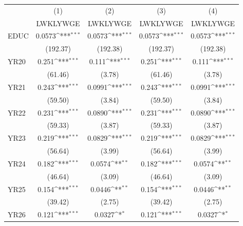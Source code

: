 {
\def\sym#1{\ifmmode^{#1}\else\(^{#1}\)\fi}
\begin{tabular}{l*{4}{c}}
\hline\hline
            &\multicolumn{1}{c}{(1)}&\multicolumn{1}{c}{(2)}&\multicolumn{1}{c}{(3)}&\multicolumn{1}{c}{(4)}\\
            &\multicolumn{1}{c}{LWKLYWGE}&\multicolumn{1}{c}{LWKLYWGE}&\multicolumn{1}{c}{LWKLYWGE}&\multicolumn{1}{c}{LWKLYWGE}\\
\hline
EDUC        &      0.0573\sym{***}&      0.0573\sym{***}&      0.0573\sym{***}&      0.0573\sym{***}\\
            &    (192.37)         &    (192.38)         &    (192.37)         &    (192.38)         \\
[1em]
YR20        &       0.251\sym{***}&       0.111\sym{***}&       0.251\sym{***}&       0.111\sym{***}\\
            &     (61.46)         &      (3.78)         &     (61.46)         &      (3.78)         \\
[1em]
YR21        &       0.243\sym{***}&      0.0991\sym{***}&       0.243\sym{***}&      0.0991\sym{***}\\
            &     (59.50)         &      (3.84)         &     (59.50)         &      (3.84)         \\
[1em]
YR22        &       0.231\sym{***}&      0.0890\sym{***}&       0.231\sym{***}&      0.0890\sym{***}\\
            &     (59.33)         &      (3.87)         &     (59.33)         &      (3.87)         \\
[1em]
YR23        &       0.219\sym{***}&      0.0829\sym{***}&       0.219\sym{***}&      0.0829\sym{***}\\
            &     (56.64)         &      (3.99)         &     (56.64)         &      (3.99)         \\
[1em]
YR24        &       0.182\sym{***}&      0.0574\sym{**} &       0.182\sym{***}&      0.0574\sym{**} \\
            &     (46.64)         &      (3.09)         &     (46.64)         &      (3.09)         \\
[1em]
YR25        &       0.154\sym{***}&      0.0446\sym{**} &       0.154\sym{***}&      0.0446\sym{**} \\
            &     (39.42)         &      (2.75)         &     (39.42)         &      (2.75)         \\
[1em]
YR26        &       0.121\sym{***}&      0.0327\sym{*}  &       0.121\sym{***}&      0.0327\sym{*}  \\

\end{tabular}}
